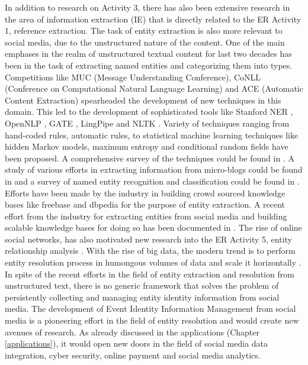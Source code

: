 In addition to research on Activity 3, there has also been extensive research in the area of information extraction (IE) that is directly related to the ER Activity 1, reference extraction. The task of entity extraction is also more relevant to social media, due to the unstructured nature of the content. One of the main emphases in the realm of unstructured textual content for last two decades has been in the task of extracting named entities and categorizing them into types. Competitions like MUC (Message Understanding Conference), CoNLL (Conference on Computational Natural Language Learning) and ACE (Automatic Content Extraction) spearheaded the development of new techniques in this domain. This led to the development of sophisticated tools like Stanford NER \cite{finkel2007named}, OpenNLP \cite{baldridge2005opennlp}, GATE \cite{cunningham2002gate}, LingPipe \cite{baldwin2003lingpipe} and NLTK \cite{bird2006nltk}. Variety of techniques ranging from hand-coded rules, automatic rules, to statistical machine learning techniques like hidden Markov models, maximum entropy and conditional random fields have been proposed. A comprehensive survey of the techniques could be found in \cite{piskorski2013information,sarawagi2008information}. A study of various efforts in extracting information from micro-blogs could be found in \cite{hua2012information} and a survey of named entity recognition and classification could be found in \cite{nadeau2007survey}. Efforts have been made by the industry in building crowd sourced knowledge bases like freebase \cite{bollacker2008freebase} and dbpedia \cite{auer2007dbpedia} for the purpose of entity extraction. A recent effort from the industry for extracting entities from social media and building scalable knowledge bases for doing so has been documented in \cite{deshpande2013building,gattani2013entity}. The rise of online social networks, has also motivated new research into the ER Activity 5, entity relationship analysis \cite{bilgic2006d}. With the rise of big data, the modern trend is to perform entity resolution process in humongous volumes of data and scale it horizontally \cite{kolb2012dedoop}. In spite of the recent efforts in the field of entity extraction and resolution from unstructured text, there is no generic framework that solves the problem of persistently collecting and managing entity identity information from social media. The development of Event Identity Information Management from social media is a pioneering effort in the field of entity resolution and would create new avenues of research. As already discussed in the applications (Chapter \ref{applications}), it would open new doors in the field of social media data integration, cyber security, online payment and social media analytics.

